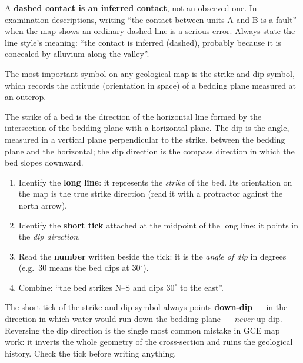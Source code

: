 \documentclass[11pt]{article}
\newcommand{\cle}[1]{{\popxbold\color{popdark}#1}}
\newcounter{popsec}
\newcounter{popsub}
\newcommand{\courssub}[1]{%
  \stepcounter{popsub}%
  \par\vspace{9pt}\noindent{\popxbold\fontsize{11.5}{13}\selectfont\color{popink}{\color{poporange}\thepopsec.\thepopsub}\hspace{6pt}#1}\par\nopagebreak\vspace{4pt}
}
\begin{document}
\begin{attention}
A \textbf{dashed contact is an inferred contact}, not an observed one. In examination descriptions, writing ``the contact between units A and B is a fault'' when the map shows an ordinary dashed line is a serious error. Always state the line style's meaning: ``the contact is inferred (dashed), probably because it is concealed by alluvium along the valley''.
\end{attention}

\courssub{Attitude Symbols: Strike and Dip}

The most important symbol on any geological map is the \cle{strike-and-dip symbol}, which records the attitude (orientation in space) of a bedding plane measured at an outcrop.

\begin{definition}
The \cle{strike} of a bed is the direction of the horizontal line formed by the intersection of the bedding plane with a horizontal plane. The \cle{dip} is the angle, measured in a vertical plane perpendicular to the strike, between the bedding plane and the horizontal; the \cle{dip direction} is the compass direction in which the bed slopes downward.
\end{definition}

\begin{methode}
\begin{enumerate}
\item Identify the \textbf{long line}: it represents the \emph{strike} of the bed. Its orientation on the map is the true strike direction (read it with a protractor against the north arrow).
\item Identify the \textbf{short tick} attached at the midpoint of the long line: it points in the \emph{dip direction}.
\item Read the \textbf{number} written beside the tick: it is the \emph{angle of dip} in degrees (e.g.\ $30$ means the bed dips at $30^{\circ}$).
\item Combine: ``the bed strikes N--S and dips $30^{\circ}$ to the east''.
\end{enumerate}
\end{methode}

\begin{attention}
The short tick of the strike-and-dip symbol always points \textbf{down-dip} --- in the direction in which water would run down the bedding plane --- \emph{never} up-dip. Reversing the dip direction is the single most common mistake in GCE map work: it inverts the whole geometry of the cross-section and ruins the geological history. Check the tick before writing anything.
\end{attention}
\end{document}
